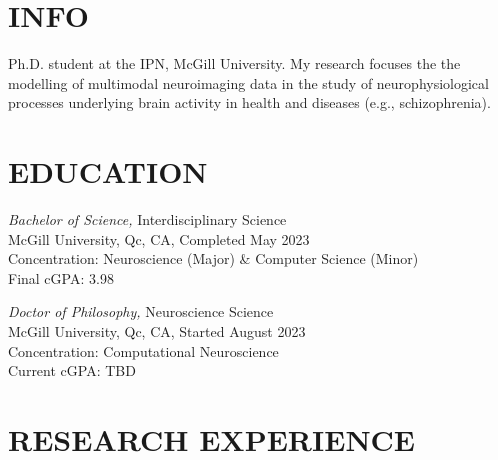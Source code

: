 \documentclass[margin, 10pt]{res} %
\begin{document}
	\begin{resume}
		
		
		\section{INFO}  
		
		Ph.D. student at the IPN, McGill University. My research focuses the the modelling of multimodal neuroimaging data in the study of neurophysiological processes underlying brain activity in health and diseases (e.g., schizophrenia).
		
		
		\section{EDUCATION}
		
		{\sl Bachelor of Science,} Interdisciplinary Science \\
		McGill University, Qc, CA, Completed May 2023 \\
		Concentration: Neuroscience (Major) \& Computer Science (Minor) \\
		Final cGPA: 3.98
		
		{\sl Doctor of Philosophy,} Neuroscience Science \\
		McGill University, Qc, CA, Started August 2023 \\
		Concentration: Computational Neuroscience \\
		Current cGPA: TBD
		
		\section{RESEARCH EXPERIENCE}
		

\end{resume}
\end{document}
